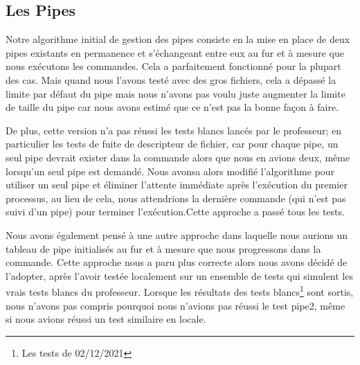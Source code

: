 \documentclass[12pt]{article}
\begin{document}
\subsection{Les Pipes}
Notre algorithme initial de gestion des pipes consiste en la mise en place de deux pipes existants en permanence et s'échangeant entre eux au fur et à mesure que nous exécutons les commandes. Cela a parfaitement fonctionné pour la plupart des cas. Mais quand nous l'avons testé avec des gros fichiers, cela a dépassé la limite par défaut du pipe mais nous n'avons pas voulu juste augmenter la limite de taille du pipe car nous avons estimé que ce n'est pas la bonne façon à faire.


De plus, cette version n'a pas réussi les tests blancs lancés par le professeur; en particulier les tests de fuite de descripteur de fichier, car pour chaque pipe, un  seul pipe devrait exister dans la commande alors que nous en avions deux, même lorsqu'un seul pipe est demandé. Nous avonsa alors modifié l'algorithme pour utiliser un seul pipe et éliminer l'attente immédiate après l'exécution du premier processus, au lieu de cela, nous attendrions la dernière commande (qui n'est pas suivi d'un pipe) pour terminer l'exécution.Cette approche a passé tous les tests.


Nous avons également pensé à une autre approche dans laquelle nous aurions un tableau de pipe initialisés au fur et à mesure que nous progressons dans la commande. Cette approche nous a paru plus correcte alors nous avons décidé de l'adopter, après l'avoir testée localement sur un ensemble de tests qui simulent les vrais tests blancs du professeur. Lorsque les résultats des tests blancs\footnote{Les tests de 02/12/2021} sont sortis, nous n'avons pas compris pourquoi nous n'avions pas réussi le test pipe2, même si nous avions réussi un test similaire en locale.
\end{document}
